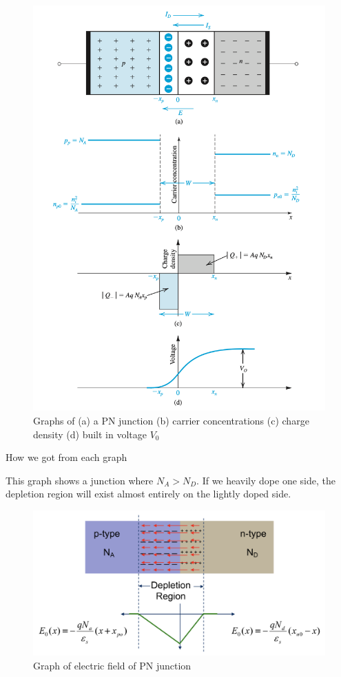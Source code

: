 \begin{figure}[htb]
    \centering
    \includegraphics[scale=0.6]{figs/ch03/3_graph.png}
    \caption{Graphs of (a) a PN junction (b) carrier concentrations (c) charge density (d) built in voltage $V_0$}
    \label{fig:3figs}
\end{figure}
\begin{todo}
    \item How we got from each graph
\end{todo}
This graph shows a junction where $N_A > N_D$. If we heavily dope one side, the depletion region will exist almost entirely on the lightly doped side.

\begin{figure}[htb]
    \centering
    \includegraphics[scale=0.5]{figs/ch03/concentration_reader.png}
    \caption{Graph of electric field of PN junction}
    \label{fig:electric_fields_pn}
\end{figure}

